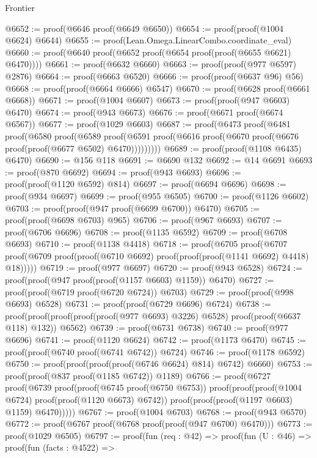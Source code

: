 \begin{lexlean}{Frontier}
\begin{coremodule}
@6652 := proof(@6646 proof(@6649 @6650))
@6654 := proof(proof(@1004 @6624) @6644)
@6655 := proof(Lean.Omega.LinearCombo.coordinate_eval)
@6660 := proof(@6640 proof(@6652 proof(@6654 proof(proof(@6655 @6621) @6470))))
@6661 := proof(@6632 @6660)
@6663 := proof(proof(@977 @6597) @2876)
@6664 := proof(@6663 @6520)
@6666 := proof(proof(@6637 @96) @56)
@6668 := proof(proof(@6664 @6666) @6547)
@6670 := proof(@6628 proof(@6661 @6668))
@6671 := proof(@1004 @6607)
@6673 := proof(proof(@947 @6603) @6470)
@6674 := proof(@943 @6673)
@6676 := proof(@6671 proof(@6674 @6567))
@6677 := proof(@1029 @6603)
@6687 := proof(@6473
      proof(@6481
          proof(@6580
              proof(@6589
                  proof(@6591
                      proof(@6616 proof(@6670 proof(@6676 proof(proof(@6677 @6502) @6470)))))))))
@6689 := proof(proof(@1108 @6435) @6470)
@6690 := @156 @118
@6691 := @6690 @132
@6692 := @14 @6691
@6693 := proof(@870 @6692)
@6694 := proof(@943 @6693)
@6696 := proof(proof(@1120 @6592) @814)
@6697 := proof(@6694 @6696)
@6698 := proof(@934 @6697)
@6699 := proof(@955 @6505)
@6700 := proof(@1126 @6602)
@6703 := proof(proof(@947 proof(@6699 @6700)) @6470)
@6705 := proof(proof(@6698 @6703) @965)
@6706 := proof(@967 @6693)
@6707 := proof(@6706 @6696)
@6708 := proof(@1135 @6592)
@6709 := proof(@6708 @6693)
@6710 := proof(@1138 @4418)
@6718 := proof(@6705
      proof(@6707
          proof(@6709 proof(proof(@6710 @6692) proof(proof(proof(@1141 @6692) @4418) @18)))))
@6719 := proof(@977 @6697)
@6720 := proof(@943 @6528)
@6724 := proof(proof(@947 proof(proof(@1157 @6603) @1159)) @6470)
@6727 := proof(proof(@6719 proof(@6720 @6724)) @6703)
@6729 := proof(proof(@998 @6693) @6528)
@6731 := proof(proof(@6729 @6696) @6724)
@6738 := proof(proof(proof(proof(proof(@977 @6693) @3226) @6528) proof(proof(@6637 @118) @132))
      @6562)
@6739 := proof(@6731 @6738)
@6740 := proof(@977 @6696)
@6741 := proof(@1120 @6624)
@6742 := proof(@1173 @6470)
@6745 := proof(proof(@6740 proof(@6741 @6742)) @6724)
@6746 := proof(@1178 @6592)
@6750 := proof(proof(proof(proof(@6746 @6624) @814) @6742) @6660)
@6753 := proof(proof(@837 proof(@1185 @6742)) @1189)
@6766 := proof(@6727
      proof(@6739
          proof(proof(@6745 proof(@6750 @6753))
              proof(proof(proof(@1004 @6724) proof(proof(@1120 @6673) @6742))
                  proof(proof(proof(@1197 @6603) @1159) @6470)))))
@6767 := proof(@1004 @6703)
@6768 := proof(@943 @6570)
@6772 := proof(@6767 proof(@6768 proof(proof(@947 @6700) @6470)))
@6773 := proof(@1029 @6505)
@6797 := proof(fun (req : @42) =>
    proof(fun (U : @46) =>
      proof(fun (facts : @4522) =>

\end{coremodule}
\end{lexlean}
